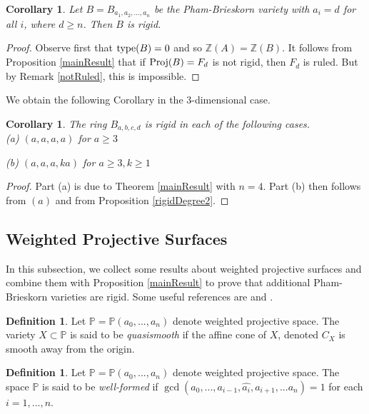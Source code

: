 \documentclass[12pt]{amsart}
\theoremstyle{plain}
\newtheorem{corollary}[subsection]{Corollary}
\theoremstyle{definition}
\newtheorem{definition}[subsection]{Definition}
\newcommand{\Proj}{		\operatorname{{\rm Proj}}}
\newcommand{\type}{		\operatorname{{\rm type}}}
\newcommand{\Integ}{\ensuremath{\mathbb{Z}}}
\newcommand{\proj}{\ensuremath{\mathbb{P}}}
\begin{document}
	\begin{corollary} Let $B = B_{a_1,a_2,...,a_n}$ be the Pham-Brieskorn variety with $a_i = d$ for all $i$, where $d \geq n$. Then $B$ is rigid. 
	\end{corollary}
	
	\begin{proof} Observe first that $\type(B) = 0$ and so $\Integ(A) = \Integ(B)$. It follows from Proposition \ref{mainResult} that if $\Proj(B) = F_d$ is not rigid, then $F_d$ is ruled. But by Remark \ref{notRuled}, this is impossible. 
	\end{proof}
	
	We obtain the following Corollary in the 3-dimensional case. 
	
	\begin{corollary}
		The ring $B_{a,b,c,d}$ is rigid in each of the following cases.
		\\
		
		(a) $(a,a,a,a)$ for $a \geq 3$
		
		(b) $(a,a,a,ka)$ for $a \geq 3, k \geq 1$
	\end{corollary}
	\begin{proof}
		Part (a) is due to Theorem \ref{mainResult} with $n = 4$. Part (b) then follows from $(a)$ and from Proposition \ref{rigidDegree2}. 
	\end{proof}
	
	
	
	\subsection{Weighted Projective Surfaces} 
	
	
	In this subsection, we collect some results about weighted projective surfaces and combine them with Proposition \ref{mainResult} to prove that additional Pham-Brieskorn varieties are rigid. Some useful references are \cite{iano-fletcher_2000} and \cite{dolgachev}.	
	
	\begin{definition}
		Let $\proj = \proj(a_0, ..., a_n)$ denote weighted projective space. The variety $X \subset \proj$ is said to be \textit{quasismooth} if the affine cone of $X$, denoted $C_X$ is smooth away from the origin. 
	\end{definition}
	
	\begin{definition} \label{wellformed1} Let $\proj = \proj(a_0, ..., a_n)$ denote weighted projective space. The space $\proj$ is said to be \textit{well-formed} if $\gcd(a_0,...,a_{i-1}, \hat{a_i}, a_{i+1}, ... a_n) = 1$ for each $i = 1,...,n$. 
	\end{definition}
	
\end{document}
